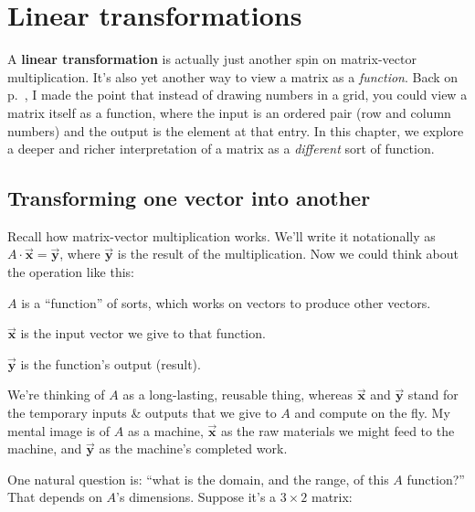 
\chapter{Linear transformations}


A \textbf{linear transformation} is actually just another spin on matrix-vector
multiplication. It's also yet another way to view a matrix as a
\textit{function}. Back on p.~\pageref{matrixIsFunction}, I made the point that
instead of drawing numbers in a grid, you could view a matrix itself as a
function, where the input is an ordered pair (row and column numbers) and the
output is the element at that entry. In this chapter, we explore a deeper and
richer interpretation of a matrix as a \textit{different} sort of function.

\section{Transforming one vector into another}

Recall how matrix-vector multiplication works. We'll write it notationally as
$A \cdot \overrightarrow{\textbf{x}} = \overrightarrow{\textbf{y}}$, where
$\overrightarrow{\textbf{y}}$ is the result of the multiplication. Now we could
think about the operation like this:

\begin{compactitem}
\item $A$ is a ``function'' of sorts, which works on vectors to produce other
vectors.
\item $\overrightarrow{\textbf{x}}$ is the input vector we give to that
function.
\item $\overrightarrow{\textbf{y}}$ is the function's output (result).
\end{compactitem}

We're thinking of $A$ as a long-lasting, reusable thing, whereas
$\overrightarrow{\textbf{x}}$ and $\overrightarrow{\textbf{y}}$ stand for the
temporary inputs \& outputs that we give to $A$ and compute on the fly. My
mental image is of $A$ as a machine, $\overrightarrow{\textbf{x}}$ as the raw
materials we might feed to the machine, and $\overrightarrow{\textbf{y}}$ as
the machine's completed work.

One natural question is: ``what is the domain, and the range, of this $A$
function?'' That depends on $A$'s dimensions. Suppose it's a $3\times 2$
matrix:

